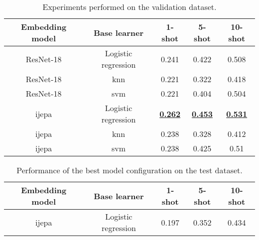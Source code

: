\begin{table}[h!]
\centering
\begin{tabular}{ c c c c c }
	\hline
	\textbf{Embedding model} & \textbf{Base learner} & \textbf{1-shot} & \textbf{5-shot} & \textbf{10-shot} \\
	\hline
	ResNet-18 & Logistic regression & 0.241 & 0.422 & 0.508 \\
	ResNet-18 & \gls{knn} & 0.221 & 0.322 & 0.418 \\
	ResNet-18 & \gls{svm} & 0.221 & 0.404 & 0.504 \\
	\hline
	\gls{ijepa} & Logistic regression & \underline{\textbf{0.262}} & \underline{\textbf{0.453}} & \underline{\textbf{0.531}} \\
	\gls{ijepa} & \gls{knn} & 0.238 & 0.328 & 0.412 \\
	\gls{ijepa} & \gls{svm} & 0.238 & 0.425 & 0.51 \\
	\hline
\end{tabular}
\caption{Experiments performed on the validation dataset.}
\label{table:validation}
\end{table}

\begin{table}[h!]
\centering
\begin{tabular}{ c c c c c }
	\hline
	\textbf{Embedding model} & \textbf{Base learner} & \textbf{1-shot} & \textbf{5-shot} & \textbf{10-shot} \\
	\hline
	\gls{ijepa} & Logistic regression & 0.197 & 0.352 & 0.434 \\
	\hline
\end{tabular}
\caption{Performance of the best model configuration on the test dataset.}
\label{table:test}
\end{table}

